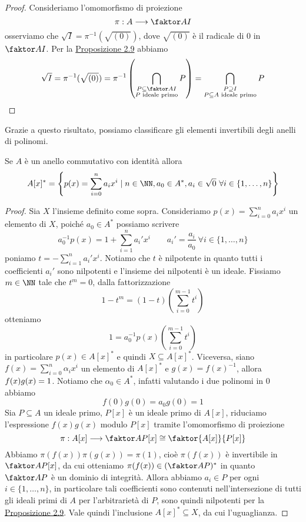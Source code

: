\documentclass[11pt]{scrartcl}
\begin{document}
	\begin{proof}
		Consideriamo l'omomorfismo di proiezione
		\[
		\pi: A\longrightarrow \faktor A I
		\]
		osserviamo che $\sqrt{I} = \pi^{-1}(\sqrt{(0)})$, dove $\sqrt{(0)}$ è il radicale di 
		$0$ in $\faktor A I$. Per la \hyperref[prop2.9]{Proposizione 2.9}
		abbiamo
		\[
		\sqrt{I} = \pi^{-1}(\sqrt{(0)}) = \pi^{-1}\left(\bigcap_{\substack{
				P\subseteq \faktor A I\\ P \text{ ideale primo}}} P\right) = 
		\bigcap_{\substack{P\supseteq I\\P \subseteq A\text{ ideale primo}}}P
		\]
	\end{proof}
	
	Grazie a questo risultato, possiamo classificare gli elementi invertibili 
	degli anelli di polinomi.
	
	\begin{proposition}
		Se $A$ è un anello commutativo con identità allora 
		\[
		A[x]^* = \left\{p(x) = \sum_{i = 0}^n a_ix^i\mid n \in \NN,
		a_0 \in A^*, a_i \in \sqrt{0}~\forall i \in \{1, \ldots, n\}\right\}
		\]
	\end{proposition}
	
	\begin{proof}
		Sia $X$ l'insieme definito come sopra. Consideriamo 
		$p(x) = \displaystyle\sum_{i = 0}^n a_i x^i$ un elemento di $X$, poiché
		$a_0 \in A^*$ possiamo scrivere 
		\[
		a_0^{-1}p(x) = 1 + \sum_{i = 1}^n a_i'x^i \qquad 
		a_i' = \frac{a_i}{a_0}~\forall i \in \{1, \ldots,n\}
		\]
		poniamo $t = \displaystyle -\sum_{i = 1}^n a_i'x^i$. Notiamo che $t$ è
		nilpotente in quanto tutti i coefficienti $a_i'$ sono nilpotenti e l'insieme
		dei nilpotenti è un ideale. Fissiamo $m \in \NN$ tale che $t^m = 0$, 
		dalla fattorizzazione 
		\[
		1 - t^m = (1 - t)\left(\sum_{i = 0}^{m - 1}t^i\right)
		\]
		otteniamo 
		\[
		1 = a_0^{-1}p(x)\left(\sum_{i = 0}^{m - 1}t^i\right)
		\]
		in particolare $p(x) \in A[x]^*$ e quindi $X \subseteq A[x]^*$.\newline
		Viceversa, siano $f(x) = \displaystyle\sum_{i = 0}^n\alpha_ix^i$ un 
		elemento di $A[x]^*$ e $g(x) = f(x)^{-1}$, allora $f(x)g(x) = \nolinebreak 1$.
		Notiamo che $\alpha_0 \in A^*$, infatti valutando i due polinomi in 0
		abbiamo
		\[
		f(0)g(0) = a_0g(0) = 1
		\]
		Sia $P \subseteq A$ un ideale primo, $P[x]$ è un ideale primo di $A[x]$,
		riduciamo l'espressione $f(x)g(x)$ modulo $P[x]$ tramite l'omomorfismo 
		di proiezione
		\[
		\pi: A[x]\longrightarrow \faktor A P [x] \cong \faktor{A[x]}{P[x]}
		\]
		Abbiamo $\pi(f(x))\pi(g(x)) = \pi(1)$, cioè $\pi(f(x))$ è invertibile in 
		$\faktor A P [x]$, da cui otteniamo $\pi(f(x)) \in (\faktor A P)^*$ in quanto $\faktor A P$
		è un dominio di integrità. Allora abbiamo $a_i \in P$ per ogni $i \in \{1, \ldots, n\}$,
		in particolare tali coefficienti sono contenuti nell'intersezione di tutti
		gli ideali primi di $A$ per l'arbitrarietà di $P$, sono quindi nilpotenti
		per la \hyperref[prop2.9]{Proposizione 2.9}. Vale quindi l'inclusione 
		$A[x]^* \subseteq X$, da cui l'uguaglianza.
	\end{proof}
	
\end{document}
